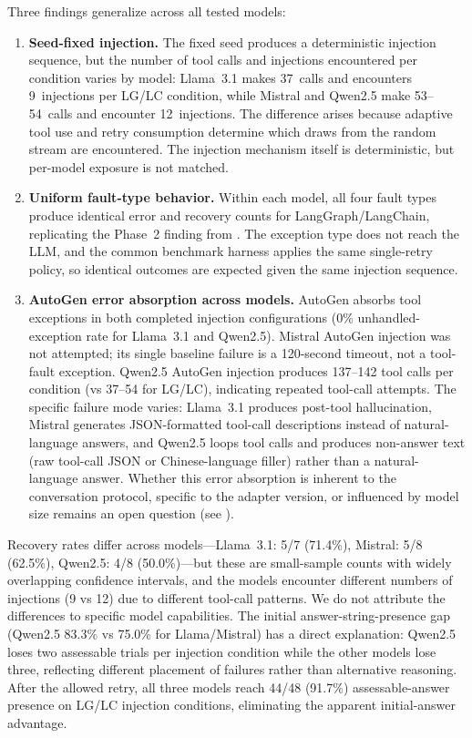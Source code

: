 \documentclass[make,article,submit,moreauthors,pdftex]{mdpi}
\providecommand{\rthree}[1]{\textcolor{green!50!black}{#1}} %
\begin{document}
\rthree{Three findings generalize across all tested models:}

\begin{enumerate}
  \item {\color{green!50!black}\textbf{Seed-fixed injection.} The fixed seed produces a deterministic injection sequence, but the number of tool calls and injections encountered per condition varies by model: Llama~3.1 makes 37~calls and encounters 9~injections per LG/LC condition, while Mistral and Qwen2.5 make 53--54~calls and encounter 12~injections. The difference arises because adaptive tool use and retry consumption determine which draws from the random stream are encountered. The injection mechanism itself is deterministic, but per-model exposure is not matched.}
  \item {\color{green!50!black}\textbf{Uniform fault-type behavior.} Within each model, all four fault types produce identical error and recovery counts for LangGraph/LangChain, replicating the Phase~2 finding from . The exception type does not reach the LLM, and the common benchmark harness applies the same single-retry policy, so identical outcomes are expected given the same injection sequence.}
  \item {\color{green!50!black}\textbf{AutoGen error absorption across models.} AutoGen absorbs tool exceptions in both completed injection configurations (0\% unhandled-exception rate for Llama~3.1 and Qwen2.5). Mistral AutoGen injection was not attempted; its single baseline failure is a 120-second timeout, not a tool-fault exception. Qwen2.5 AutoGen injection produces 137--142 tool calls per condition (vs 37--54 for LG/LC), indicating repeated tool-call attempts. The specific failure mode varies: Llama~3.1 produces post-tool hallucination, Mistral generates JSON-formatted tool-call descriptions instead of natural-language answers, and Qwen2.5 loops tool calls and produces non-answer text (raw tool-call JSON or Chinese-language filler) rather than a natural-language answer. Whether this error absorption is inherent to the conversation protocol, specific to the adapter version, or influenced by model size remains an open question (see ).}
\end{enumerate}

{\color{green!50!black}Recovery rates differ across models---Llama~3.1: 5/7 (71.4\%), Mistral: 5/8 (62.5\%), Qwen2.5: 4/8 (50.0\%)---but these are small-sample counts with widely overlapping confidence intervals, and the models encounter different numbers of injections (9 vs 12) due to different tool-call patterns. We do not attribute the differences to specific model capabilities. The initial answer-string-presence gap (Qwen2.5 83.3\% vs 75.0\% for Llama/Mistral) has a direct explanation: Qwen2.5 loses two assessable trials per injection condition while the other models lose three, reflecting different placement of failures rather than alternative reasoning. After the allowed retry, all three models reach 44/48 (91.7\%) assessable-answer presence on LG/LC injection conditions, eliminating the apparent initial-answer advantage.}
\end{document}
